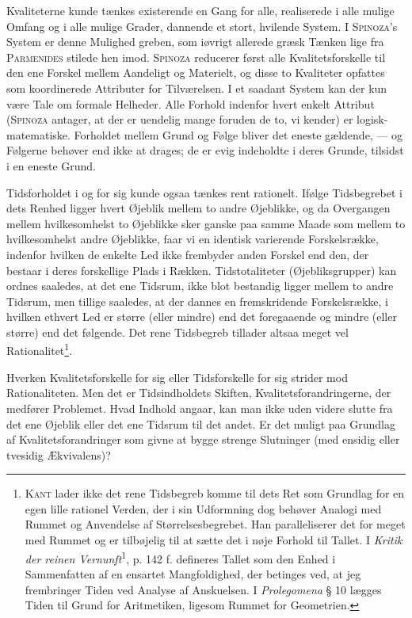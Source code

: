 \documentclass[12pt]{article}
\begin{document}
Kvaliteterne kunde tænkes existerende en Gang for alle, realiserede i alle
mulige Omfang og i alle mulige Grader, dannende et stort, hvilende System. I
\textsc{Spinoza}'s System er denne Mulighed greben, som iøvrigt allerede græsk
Tænken lige fra \textsc{Parmenides} stilede hen imod. \textsc{Spinoza} reducerer
først alle Kvalitetsforskelle til den ene Forskel mellem Aandeligt og Materielt,
og disse to Kvaliteter opfattes som koordinerede Attributer for Tilværelsen. I
et saadant System kan der kun være Tale om formale Helheder. Alle Forhold
indenfor hvert enkelt Attribut (\textsc{Spinoza} antager, at der er uendelig
mange foruden de to, vi kender) er logisk-matematiske. Forholdet mellem Grund og
Følge bliver det eneste gældende, --- og Følgerne behøver end ikke at drages; de
er evig indeholdte i deres Grunde, tilsidst i en eneste Grund.

Tidsforholdet i og for sig kunde ogsaa tænkes rent rationelt. Ifølge
Tidsbegrebet i dets Renhed ligger hvert Øjeblik mellem to andre Øjeblikke, og da
Overgangen mellem hvilkesomhelst to Øjeblikke sker ganske paa samme Maade som
mellem to hvilkesomhelst andre Øjeblikke, faar vi en identisk varierende
Forskelsrække, indenfor hvilken de enkelte Led ikke frembyder anden Forskel end
den, der bestaar i deres forskellige Plads i Rækken. Tidstotaliteter
(Øjebliksgrupper) kan ordnes saaledes, at det ene Tidsrum, ikke blot bestandig
ligger mellem to andre Tidsrum, men tillige saaledes, at der dannes en
fremskridende Forskelsrække, i hvilken ethvert Led er større (eller mindre) end
det foregaaende og mindre (eller større) end det følgende. Det rene Tidsbegreb
tillader altsaa meget vel Rationalitet\footnote{\textsc{Kant} lader ikke det
rene Tidsbegreb komme til dets Ret som Grundlag for en egen lille rationel
Verden, der i sin Udformning dog behøver Analogi med Rummet og Anvendelse af
Størrelsesbegrebet. Han paralleliserer det for meget med Rummet og er tilbøjelig
til at sætte det i nøje Forhold til Tallet. I \textit{Kritik der reinen
Vernunft}\textsuperscript{1}, p. 142 f. defineres Tallet som den Enhed i
Sammenfatten af en ensartet Mangfoldighed, der betinges ved, at jeg frembringer
Tiden ved Analyse af Anskuelsen. I \textit{Prolegomena} § 10 lægges Tiden til
Grund for Aritmetiken, ligesom Rummet for Geometrien.}.

Hverken Kvalitetsforskelle for sig eller Tidsforskelle for sig strider mod
Rationaliteten. Men det er Tidsindholdets Skiften, Kvalitetsforandringerne, der
medfører Problemet. Hvad Indhold angaar, kan man ikke uden videre slutte fra det
ene Øjeblik eller det ene Tidsrum til det andet. Er det muligt paa Grundlag af
Kvalitetsforandringer som givne at bygge strenge Slutninger (med ensidig eller
tvesidig Ækvivalens)?
\end{document}
